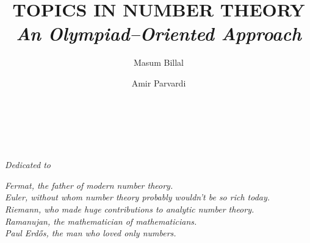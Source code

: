 \documentclass[leqno,12pt]{book}
\title{\bf\Huge TOPICS IN NUMBER THEORY\\ {\vspace*{.3in}\it\LARGE An Olympiad--Oriented Approach}\\\vspace*{.3in}{\Large Second Edition\\\vspace*{.1in}\rule{\textwidth}{0.8pt}}}
\author{
	\Huge Masum Billal
	\and \Huge Amir Parvardi
	\\\vspace*{.4in}
	\rule{\textwidth}{0.8pt}\\\vspace*{.2in}
}
\date{}
\begin{document}
\pagestyle{empty}
\maketitle
\pagestyle{empty}
\frontmatter

\begin{dedication}
	\begin{center}
		\textit{Dedicated to}
	\end{center}\slshape
	Fermat, the father of modern number theory.\\
	Euler, without whom number theory probably wouldn't be so rich today.\\
	Riemann, who made huge contributions to analytic number theory.\\
	Ramanujan, the mathematician of mathematicians.\\
	Paul Erd\H{o}s, the man who loved only numbers.
\end{dedication}
\end{document}
